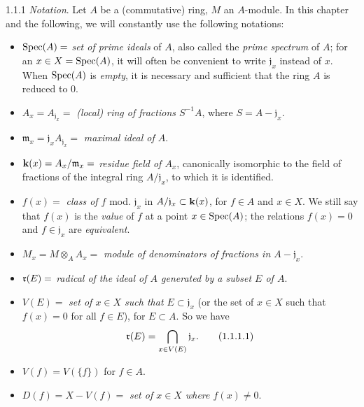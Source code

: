 \documentclass{book}
\begin{document}
\begin{env}{1.1.1}
\label{env-1.1.1.1}
\emph{Notation}. Let $A$ be a (commutative) ring, $M$ an $A$-module. In
this chapter and the following, we will constantly use the following notations:
\begin{itemize}
  \item[] ${\mathop{\mathrm{Spec}}\nolimits}(A)=$ \emph{set of prime ideals} of $A$, also called the
          \emph{prime spectrum} of $A$; for an $x\in X={\mathop{\mathrm{Spec}}\nolimits}(A)$, it will often be
          convenient to write $\mathfrak{j}_x$ instead of $x$. When ${\mathop{\mathrm{Spec}}\nolimits}(A)$ is
          \emph{empty}, it is necessary and sufficient that the ring $A$ is
          reduced to $0$.
  \item[] $A_x=A_{\mathfrak{j}_x}=$ \emph{(local) ring of fractions $S^{-1}A$},
          where $S=A-\mathfrak{j}_x$.
  \item[] $\mathfrak{m}_x=\mathfrak{j}_x A_{\mathfrak{j}_x}=$ \emph{maximal ideal of $A$}.
  \item[] $\mathbf{k}(x)=A_x/\mathfrak{m}_x=$ \emph{residue field of $A_x$},
          canonically isomorphic to the field of fractions
          of the integral ring $A/\mathfrak{j}_x$, to which it is identified.
  \item[] $f(x)=$ \emph{class of $f$} mod. $\mathfrak{j}_x$ in $A/\mathfrak{j}_x\subset\mathbf{k}(x)$,
          for $f\in A$ and $x\in X$. We still say that $f(x)$ is the \emph{value}
          of $f$ at a point $x\in{\mathop{\mathrm{Spec}}\nolimits}(A)$; the relations $f(x)=0$ and $f\in\mathfrak{j}_x$ are
          \emph{equivalent}.
  \item[] $M_x=M\otimes_A A_x=$ \emph{module of denominators of fractions in $A-\mathfrak{j}_x$}.
  \item[] $\mathfrak{r}(E)=$ \emph{radical of the ideal of $A$ generated by a subset $E$ of $A$}.
  \item[] $V(E)=$ \emph{set of $x\in X$ such that $E\subset\mathfrak{j}_x$} (or the set of $x\in X$
          such that $f(x)=0$ for all $f\in E$), for $E\subset A$. So we have
          \[
            \mathfrak{r}(E)=\bigcap_{x\in V(E)}\mathfrak{j}_x.\tag{1.1.1.1}
          \]
  \item[] $V(f)=V(\{f\})$ for $f\in A$.
  \item[] $D(f)=X-V(f)=$ \emph{set of $x\in X$ where $f(x)\neq 0$}.
\end{itemize}
\end{env}
\end{document}
